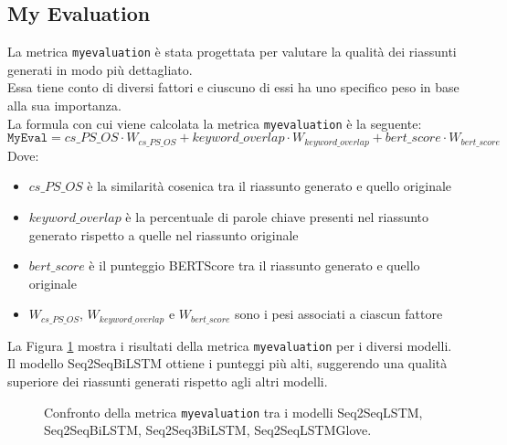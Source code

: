 \subsection{My Evaluation}
La metrica \texttt{myevaluation} \`e stata progettata per valutare la qualit\`a dei riassunti generati in modo pi\`u dettagliato.\\
Essa tiene conto di diversi fattori e ciuscuno di essi ha uno specifico peso in base alla sua importanza.\\
La formula con cui viene calcolata la metrica \texttt{myevaluation} \`e la seguente:
\[
    \texttt{MyEval} = cs\_PS\_OS \cdot W_{cs\_PS\_OS} + keyword\_overlap \cdot W_{keyword\_overlap} + bert\_score \cdot W_{bert\_score}
\]
Dove:
\begin{itemize}
    \item $cs\_PS\_OS$ \`e la similarit\`a cosenica tra il riassunto generato e quello originale
    \item $keyword\_overlap$ \`e la percentuale di parole chiave presenti nel riassunto generato rispetto a quelle nel riassunto originale
    \item $bert\_score$ \`e il punteggio BERTScore tra il riassunto generato e quello originale
    \item $W_{cs\_PS\_OS}$, $W_{keyword\_overlap}$ e $W_{bert\_score}$ sono i pesi associati a ciascun fattore
\end{itemize}

La Figura \ref{fig:myevaluation_comparison} mostra i risultati della metrica \texttt{myevaluation} per i diversi modelli.\\
Il modello Seq2SeqBiLSTM ottiene i punteggi pi\`u alti, suggerendo una qualit\`a superiore dei riassunti generati rispetto agli altri modelli.
\begin{figure}[H]
    \centering
    \hfill
    \hfill
    \hfill
    
    \caption{Confronto della metrica \texttt{myevaluation} tra i modelli Seq2SeqLSTM, Seq2SeqBiLSTM, Seq2Seq3BiLSTM, Seq2SeqLSTMGlove.}
    \label{fig:myevaluation_comparison}
\end{figure}